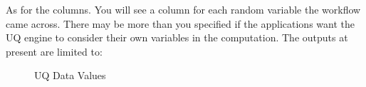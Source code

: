 As for the columns. You will see a column for each random variable the
workflow came across. There may be more than you specified if the
applications want the UQ engine to consider their own variables in the
computation. The outputs at present are limited to:

\begin{figure}[!htbp]
  \caption{UQ Data Values}
  \label{fig:figure14}
\end{figure}
